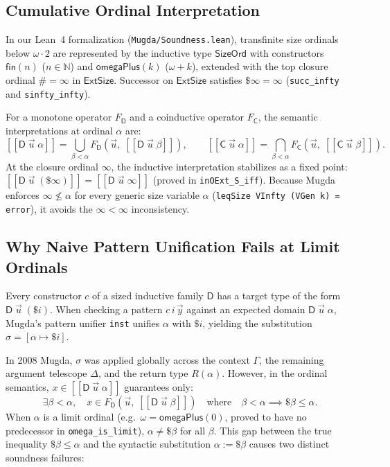 \documentclass[11pt,a4paper]{article}
\newcommand{\llbracket}{[\![}
\newcommand{\rrbracket}{]\!]}
\begin{document}
\subsection{Cumulative Ordinal Interpretation}

In our Lean~4 formalization (\texttt{Mugda/Soundness.lean}), transfinite size ordinals below $\omega \cdot 2$ are represented by the inductive type $\mathsf{SizeOrd}$ with constructors $\mathsf{fin}(n)$ ($n \in \mathbb{N}$) and $\mathsf{omegaPlus}(k)$ ($\omega + k$), extended with the top closure ordinal $\# = \infty$ in $\mathsf{ExtSize}$.
Successor on $\mathsf{ExtSize}$ satisfies $\$ \infty = \infty$ (\texttt{succ\_infty} and \texttt{sinfty\_infty}).

For a monotone operator $F_{\mathsf{D}}$ and a coinductive operator $F_{\mathsf{C}}$, the semantic interpretations at ordinal $\alpha$ are:
\[
  \llbracket \mathsf{D}\;\vec{u}\;\alpha \rrbracket = \bigcup_{\beta < \alpha} F_{\mathsf{D}}\!\left(\vec{u},\; \llbracket \mathsf{D}\;\vec{u}\;\beta \rrbracket\right),
  \qquad
  \llbracket \mathsf{C}\;\vec{u}\;\alpha \rrbracket = \bigcap_{\beta < \alpha} F_{\mathsf{C}}\!\left(\vec{u},\; \llbracket \mathsf{C}\;\vec{u}\;\beta \rrbracket\right).
\]
At the closure ordinal $\infty$, the inductive interpretation stabilizes as a fixed point:
$\llbracket \mathsf{D}\;\vec{u}\;(\$ \infty) \rrbracket = \llbracket \mathsf{D}\;\vec{u}\;\infty \rrbracket$ (proved in \texttt{inOExt\_S\_iff}).
Because Mugda enforces $\infty \not\le \alpha$ for every generic size variable $\alpha$ (\texttt{leqSize VInfty (VGen k) = error}), it avoids the $\infty < \infty$ inconsistency.

\subsection{Why Naive Pattern Unification Fails at Limit Ordinals}

Every constructor $c$ of a sized inductive family $\mathsf{D}$ has a target type of the form $\mathsf{D}\;\vec{u}\;(\$ i)$.
When checking a pattern $c\,i\,\vec{y}$ against an expected domain $\mathsf{D}\;\vec{u}\;\alpha$, Mugda's pattern unifier \texttt{inst} unifies $\alpha$ with $\$ i$, yielding the substitution $\sigma = [\alpha \mapsto \$ i]$.

In 2008 Mugda, $\sigma$ was applied globally across the context $\Gamma$, the remaining argument telescope $\Delta$, and the return type $R(\alpha)$.
However, in the ordinal semantics, $x \in \llbracket \mathsf{D}\;\vec{u}\;\alpha \rrbracket$ guarantees only:
\[
  \exists \beta < \alpha,\quad x \in F_{\mathsf{D}}\!\left(\vec{u},\; \llbracket \mathsf{D}\;\vec{u}\;\beta \rrbracket\right)
  \quad\text{where}\quad \beta < \alpha \implies \$ \beta \le \alpha.
\]
When $\alpha$ is a limit ordinal (e.g.\ $\omega = \mathsf{omegaPlus}(0)$, proved to have no predecessor in \texttt{omega\_is\_limit}), $\alpha \neq \$ \beta$ for all $\beta$.
This gap between the true inequality $\$ \beta \le \alpha$ and the syntactic substitution $\alpha := \$ \beta$ causes two distinct soundness failures:
\end{document}
